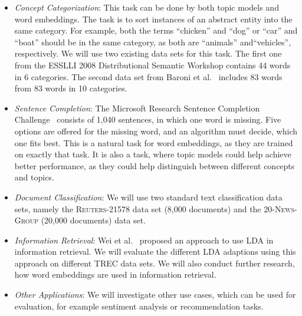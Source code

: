 \documentclass{sig-alternate-05-2015}
\begin{document}
\begin{itemize}
       \item
              \emph{Concept Categorization}:
              This task can be done by both topic models and word embeddings.
              The task is to sort instances of an abstract entity into the same category.
              For example, both the terms ``chicken'' and ``dog'' or ``car'' and ``boat'' should be in the same category, as both are ``animals'' and``vehicles'', respectively.
              We will use two existing data sets for this task.
              The first one from the ESSLLI 2008 Distributional Semantic Workshop contains 44 words in 6 categories.
              The second data set from Baroni et al.~\cite{Baroni2010} includes 83 words from 83 words in 10 categories.
       \item
              \emph{Sentence Completion}:
              The Microsoft Research Sentence Completion Challenge~\cite{Zweig2011} consists of 1,040 sentences, in which one word is missing.
              Five options are offered for the missing word, and an algorithm must decide, which one fits best.
              This is a natural task for word embeddings, as they are trained on exactly that task.
              It is also a task, where topic models could help achieve better performance, as they could help distinguish between different concepts and topics.
       \item
              \emph{Document Classification}:
              We will use two standard text classification data sets, namely the \textsc{Reuters-21578} data set (8,000 documents) and the \textsc{20-News-Group} (20,000 documents) data set.
       \item
              \emph{Information Retrieval}:
              Wei et al.~\cite{Wei2006} proposed an approach to use LDA in information retrieval.
              We will evaluate the different LDA adaptions using this approach on different TREC data sets.
              We will also conduct further research, how word embeddings are used in information retrieval.
       \item
              \emph{Other Applications}: We will investigate other use cases, which can be used for evaluation, for example sentiment analysis or recommendation tasks.

\end{itemize}
\end{document}
